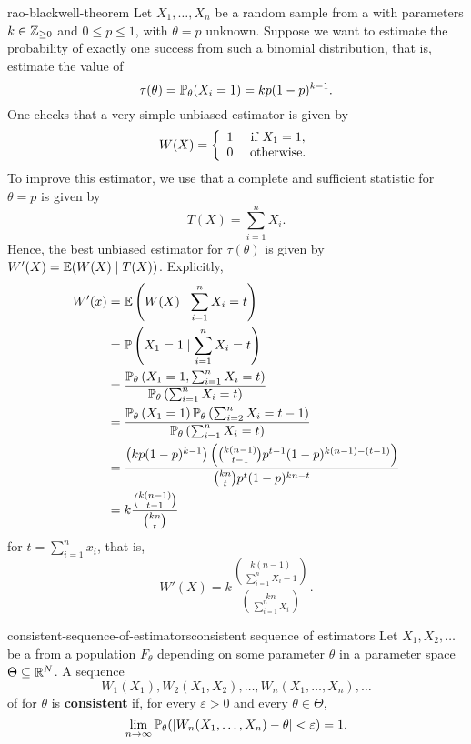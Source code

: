 \begin{example}{rao-blackwell-theorem}
    Let $X_1, \ldots, X_n$ be a random sample from a  with parameters $k \in \mathbb{Z}_{\ge 0}$ and $0 \le p \le 1$, with $\theta = p$ unknown. Suppose we want to estimate the probability of exactly one success from such a binomial distribution, that is, estimate the value of
    \[ \tau(\theta) = \mathbb{P}_\theta(X_i = 1) = k p (1 - p)^{k - 1} . \]
    One checks that a very simple unbiased estimator is given by
    \[ W(X) = \left\{ \begin{array}{cc} 1 & \textup{ if } X_1 = 1, \\ 0 & \textup{ otherwise} .
    \end{array} \right. \]
    To improve this estimator, we use that a complete and sufficient statistic for $\theta = p$ is given by
    \[ T(X) = \sum_{i = 1}^{n} X_i . \]
    Hence, the best unbiased estimator for $\tau(\theta)$ is given by $W'(X) = \mathbb{E}(W(X) \mid T(X))$. Explicitly,
    \[ \begin{aligned}
         W'(x) &= \mathbb{E} \left( W(X) \mid \sum_{i = 1}^{n} X_i = t \right) \\
            &= \mathbb{P} \left( X_1 = 1 \mid \sum_{i = 1}^{n} X_i = t \right) \\
            &= \frac{\mathbb{P}_\theta \left( X_1 = 1, \sum_{i = 1}^{n} X_i = t \right)}{\mathbb{P}_\theta \left( \sum_{i = 1}^{n} X_i = t \right)} \\
            &= \frac{\mathbb{P}_\theta \left( X_1 = 1 \right) \mathbb{P}_\theta \left( \sum_{i = 2}^{n} X_i = t - 1 \right)}{\mathbb{P}_\theta \left( \sum_{i = 1}^{n} X_i = t \right)} \\
            &= \frac{\left( kp (1 - p)^{k - 1} \right) \left( \binom{k(n - 1)}{t - 1} p^{t - 1} (1 - p)^{k(n - 1) - (t - 1)} \right)}{\binom{kn}{t} p^t (1 - p)^{kn - t}} \\
            &= k \frac{\binom{k (n - 1)}{t - 1}}{\binom{kn}{t}}
    \end{aligned} \]
    for $t = \sum_{i = 1}^{n} x_i$, that is,
    \[ W'(X) = k \frac{\binom{k (n - 1)}{\sum_{i = 1}^{n} X_i - 1}}{\binom{kn}{\sum_{i = 1}^{n} X_i}} . \]
\end{example}

\begin{topic}{consistent-sequence-of-estimators}{consistent sequence of estimators}
    Let $X_1, X_2, \ldots$ be a  from a population $F_\theta$ depending on some parameter $\theta$ in a parameter space $\Theta \subseteq \mathbb{R}^N$. A sequence
    \[ W_1(X_1), W_2(X_1, X_2), \ldots, W_n(X_1, \ldots, X_n), \ldots \]
    of  for $\theta$ is \textbf{consistent} if, for every $\varepsilon > 0$ and every $\theta \in \Theta$,
    \[ \lim_{n \to \infty} \mathbb{P}_\theta(|W_n(X_1, \ldots, X_n) - \theta| < \varepsilon) = 1 . \]
\end{topic}


